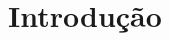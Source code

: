 \documentclass[pdflatex,sn-mathphys-num]{sn-jnl}%
\theoremstyle{thmstyleone}%
\theoremstyle{thmstyletwo}%
\theoremstyle{thmstylethree}%
\begin{document}
% 
% 
% 




\maketitle

\section*{Introdução}
\end{document}
